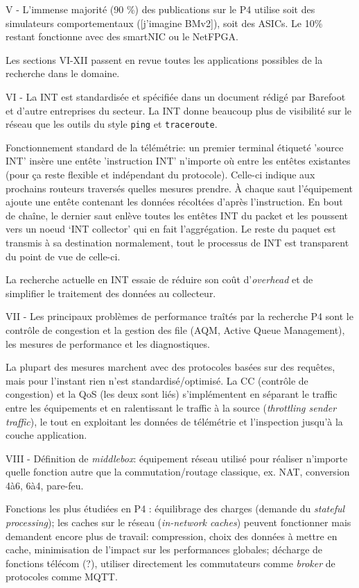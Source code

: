 V - L'immense majorité (90 \%) des publications sur le P4 utilise soit des simulateurs comportementaux ([j'imagine BMv2]), soit des ASICs. Le 10\% restant fonctionne avec des smartNIC ou le NetFPGA.

Les sections VI-XII passent en revue toutes les applications possibles de la recherche dans le domaine.

VI - La INT est standardisée et spécifiée dans un document rédigé par Barefoot et d'autre entreprises du secteur. La INT donne beaucoup plus de visibilité sur le réseau que les outils du style \texttt{ping} et \texttt{traceroute}.

Fonctionnement standard de la télémétrie: un premier terminal étiqueté 'source INT' insère une entête 'instruction INT' n'importe où entre les entêtes existantes (pour ça reste flexible et indépendant du protocole). Celle-ci indique aux prochains routeurs traversés quelles mesures prendre. À chaque saut l'équipement ajoute une entête contenant les données récoltées d'après l'instruction. En bout de chaîne, le dernier saut enlève toutes les entêtes INT du packet et les poussent vers un noeud `INT collector' qui en fait l'aggrégation. Le reste du paquet est transmis à sa destination normalement, tout le processus de INT est transparent du point de vue de celle-ci.

La recherche actuelle en INT essaie de réduire son coût d'\emph{overhead} et de simplifier le traitement des données au collecteur.

VII - Les principaux problèmes de performance traîtés par la recherche P4 sont le contrôle de congestion et la gestion des file (AQM, Active Queue Management), les mesures de performance et les diagnostiques.

La plupart des mesures marchent avec des protocoles basées sur des requêtes, mais pour l'instant rien n'est standardisé/optimisé. La CC (contrôle de congestion) et la QoS (les deux sont liés) s'implémentent en séparant le traffic entre les équipements et en ralentissant le traffic à la source (\emph{throttling sender traffic}), le tout en exploitant les données de télémétrie et l'inspection jusqu'à la couche application.

VIII - Définition de \emph{middlebox}: équipement réseau utilisé pour réaliser n'importe quelle fonction autre que la commutation/routage classique, ex. NAT, conversion 4à6, 6à4, pare-feu.

Fonctions les plus étudiées en P4 : équilibrage des charges (demande du \emph{stateful processing}); les caches sur le réseau (\emph{in-network caches}) peuvent fonctionner mais demandent encore plus de travail: compression, choix des données à mettre en cache, minimisation de l'impact sur les performances globales; décharge de fonctions télécom (?), utiliser directement les commutateurs comme \emph{broker} de protocoles comme MQTT.

